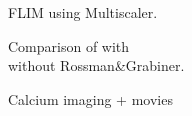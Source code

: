\documentclass[ArticleMain.tex]{subfiles}
\begin{document}
\begin{figure}
\caption{FLIM using Multiscaler.}
\end{figure}

\begin{figure}
\caption{Comparison of with\\without Rossman&Grabiner.}
\end{figure}

\begin{figure}
\end{figure}

\begin{figure}
\caption{Calcium imaging + movies}
\end{figure}



\ben{}
\end{document}
